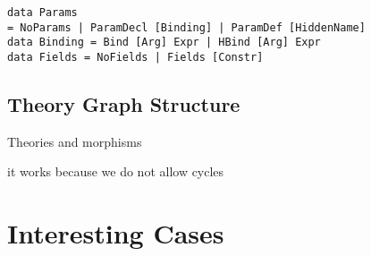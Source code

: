 \begin{lstlisting}
data Params
= NoParams | ParamDecl [Binding] | ParamDef [HiddenName]
data Binding = Bind [Arg] Expr | HBind [Arg] Expr
data Fields = NoFields | Fields [Constr]
\end{lstlisting}

\subsection{Theory Graph Structure}
Theories and morphisms 

it works because we do not allow cycles 



\section{Interesting Cases}
\label{sec:interesting_cases}

\begin{comment}
There are two different ways by which a user or a library builder can define a new theory; either by stating all its components or by reusing existing theories. While an end user might in some cases prefer the first approach for the formalization tasks, a library is more rich in information if it deploys the second approach. For example, defining a \group to be a \monoid with inverse gives us more information than what are its declarations, it also tell us about how it is related to \monoid. Most systems provide users with at least inclusions which enable them to include a verbatim version of one theory into the other, so the relation between \group and \monoid mentioned here can be captured. But, is this enough? 



\end{comment}